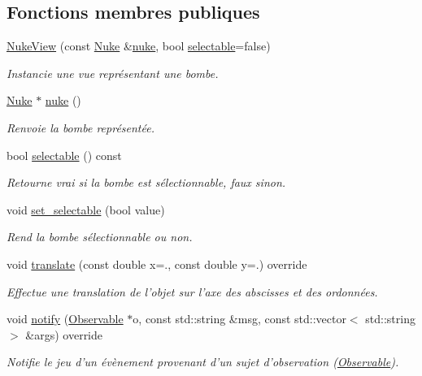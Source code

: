 \subsection*{Fonctions membres publiques}
\begin{DoxyCompactItemize}
\item 
\hyperlink{classNukeView_a9bb87e648efa96308058a68748e53a41}{Nuke\+View} (const \hyperlink{classNuke}{Nuke} \&\hyperlink{classNukeView_a8bf8e524e5627138ed6c028cb4b87d2b}{nuke}, bool \hyperlink{classNukeView_a70589619df5713cadcc47f399fae6e00}{selectable}=false)
\begin{DoxyCompactList}\small\item\em Instancie une vue représentant une bombe. \end{DoxyCompactList}\item 
\hyperlink{classNuke}{Nuke} $\ast$ \hyperlink{classNukeView_a8bf8e524e5627138ed6c028cb4b87d2b}{nuke} ()
\begin{DoxyCompactList}\small\item\em Renvoie la bombe représentée. \end{DoxyCompactList}\item 
bool \hyperlink{classNukeView_a70589619df5713cadcc47f399fae6e00}{selectable} () const 
\begin{DoxyCompactList}\small\item\em Retourne vrai si la bombe est sélectionnable, faux sinon. \end{DoxyCompactList}\item 
void \hyperlink{classNukeView_ab3761858ebbe1f6dcde7813c4118bfd0}{set\+\_\+selectable} (bool value)
\begin{DoxyCompactList}\small\item\em Rend la bombe sélectionnable ou non. \end{DoxyCompactList}\item 
void \hyperlink{classNukeView_ab5743729fc4659e2cd670d42800c9856}{translate} (const double x=., const double y=.) override
\begin{DoxyCompactList}\small\item\em Effectue une translation de l’objet sur l’axe des abscisses et des ordonnées. \end{DoxyCompactList}\item 
void \hyperlink{classNukeView_af45ef374496a0ef5b3d595ab1e5fba20}{notify} (\hyperlink{classObservable}{Observable} $\ast$o, const std\+::string \&msg, const std\+::vector$<$ std\+::string $>$ \&args) override
\begin{DoxyCompactList}\small\item\em Notifie le jeu d'un évènement provenant d'un sujet d'observation (\hyperlink{classObservable}{Observable}). \end{DoxyCompactList}\end{DoxyCompactItemize}
